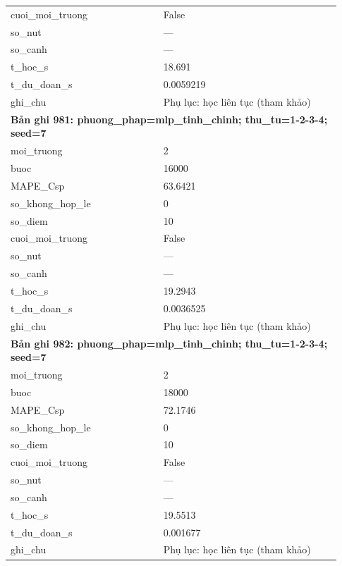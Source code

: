 \begin{longtable}{p{0.43\linewidth}p{0.50\linewidth}}
cuoi\_\allowbreak moi\_\allowbreak truong & False \\
so\_\allowbreak nut & — \\
so\_\allowbreak canh & — \\
t\_\allowbreak hoc\_\allowbreak s & 18.691 \\
t\_\allowbreak du\_\allowbreak doan\_\allowbreak s & 0.0059219 \\
ghi\_\allowbreak chu & Phụ lục: học liên tục (tham khảo) \\
\midrule
\multicolumn{2}{p{0.95\linewidth}}{\textbf{Bản ghi 981: phuong\_phap=mlp\_tinh\_chinh; thu\_tu=1-2-3-4; seed=7}} \\
moi\_\allowbreak truong & 2 \\
buoc & 16000 \\
MAPE\_\allowbreak Csp & 63.6421 \\
so\_\allowbreak khong\_\allowbreak hop\_\allowbreak le & 0 \\
so\_\allowbreak diem & 10 \\
cuoi\_\allowbreak moi\_\allowbreak truong & False \\
so\_\allowbreak nut & — \\
so\_\allowbreak canh & — \\
t\_\allowbreak hoc\_\allowbreak s & 19.2943 \\
t\_\allowbreak du\_\allowbreak doan\_\allowbreak s & 0.0036525 \\
ghi\_\allowbreak chu & Phụ lục: học liên tục (tham khảo) \\
\midrule
\multicolumn{2}{p{0.95\linewidth}}{\textbf{Bản ghi 982: phuong\_phap=mlp\_tinh\_chinh; thu\_tu=1-2-3-4; seed=7}} \\
moi\_\allowbreak truong & 2 \\
buoc & 18000 \\
MAPE\_\allowbreak Csp & 72.1746 \\
so\_\allowbreak khong\_\allowbreak hop\_\allowbreak le & 0 \\
so\_\allowbreak diem & 10 \\
cuoi\_\allowbreak moi\_\allowbreak truong & False \\
so\_\allowbreak nut & — \\
so\_\allowbreak canh & — \\
t\_\allowbreak hoc\_\allowbreak s & 19.5513 \\
t\_\allowbreak du\_\allowbreak doan\_\allowbreak s & 0.001677 \\
ghi\_\allowbreak chu & Phụ lục: học liên tục (tham khảo) \\

\end{longtable}
